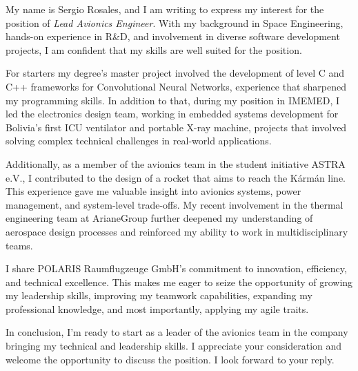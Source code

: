 


\begin{cvletter}
My name is Sergio Rosales, and I am writing to express my interest for
the position of \textit{Lead Avionics Engineer}. With my background in
Space Engineering, hands-on experience in R\&D, and involvement in
diverse software development projects, I am confident that my skills
are well suited for the position.

For starters my degree's master project involved the development of
level C and C++ frameworks for Convolutional Neural Networks,
experience that sharpened my programming skills. In addition to that,
during my position in IMEMED, I led the electronics design team,
working in embedded systems development for Bolivia's first ICU
ventilator and portable X-ray machine, projects that involved solving
complex technical challenges in real-world applications.

Additionally, as a member of the avionics team in the student
initiative ASTRA e.V., I contributed to the design of a rocket that
aims to reach the Kármán line. This experience gave me valuable
insight into avionics systems, power management, and system-level
trade-offs. My recent involvement in the thermal engineering team at
ArianeGroup further deepened my understanding of aerospace design
processes and reinforced my ability to work in multidisciplinary
teams.

I share POLARIS Raumflugzeuge GmbH's commitment to innovation,
efficiency, and technical excellence. This makes me eager to seize the
opportunity of growing my leadership skills, improving my teamwork
capabilities, expanding my professional knowledge, and most
importantly, applying my agile traits.

In conclusion, I'm ready to start as a leader of the avionics team in
the company bringing my technical and leadership skills. I appreciate
your consideration and welcome the opportunity to discuss the
position.\hfill\break
I look forward to your reply.
\end{cvletter}